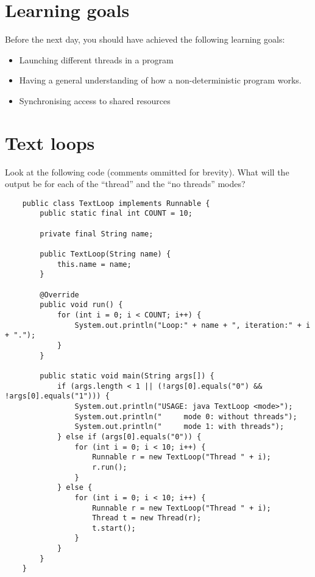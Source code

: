 \documentclass{article}
\begin{document}
\section*{Learning goals}
\label{sec:learning-goals}

Before the next day, you should have achieved the following learning
goals: 

\begin{itemize}
\item Launching different threads in a program
\item Having a general understanding of how a non-deterministic program
  works. 
\item Synchronising access to shared resources
\end{itemize}

\section{Text loops}
\label{sec:text-loops}

Look at the following code (comments ommitted for brevity). What will
the output be for each of the ``thread'' and the ``no threads'' modes? 

\begin{verbatim}
    public class TextLoop implements Runnable {
        public static final int COUNT = 10;

        private final String name;

        public TextLoop(String name) {
            this.name = name;
        }

        @Override
        public void run() {
            for (int i = 0; i < COUNT; i++) {
                System.out.println("Loop:" + name + ", iteration:" + i + ".");
            }
        }

        public static void main(String args[]) {
            if (args.length < 1 || (!args[0].equals("0") && !args[0].equals("1"))) {
                System.out.println("USAGE: java TextLoop <mode>");
                System.out.println("     mode 0: without threads");
                System.out.println("     mode 1: with threads");
            } else if (args[0].equals("0")) {
                for (int i = 0; i < 10; i++) {
                    Runnable r = new TextLoop("Thread " + i);
                    r.run();
                }
            } else {
                for (int i = 0; i < 10; i++) {
                    Runnable r = new TextLoop("Thread " + i);
                    Thread t = new Thread(r);
                    t.start();
                }
            }
        }
    }
\end{verbatim}
\end{document}
